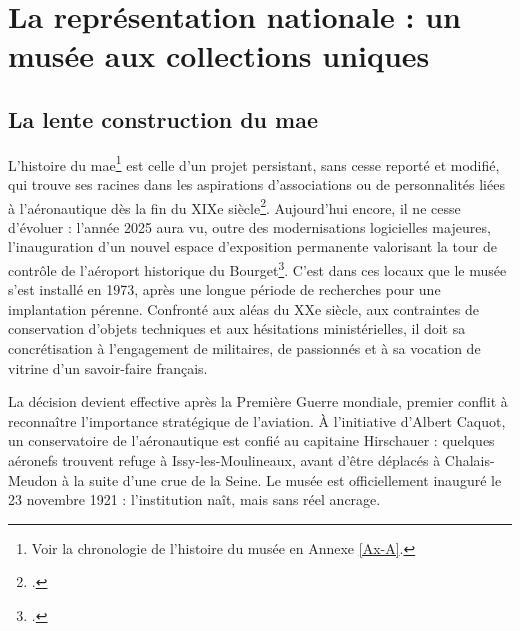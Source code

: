 %

\section{\label{I-A-1}La représentation nationale : un musée aux collections uniques}

\subsection{La lente construction du \ac{mae}}

L’histoire du \acf{mae}\footnote{Voir la chronologie de l'histoire du musée en Annexe \ref{Ax-A}.} est celle d’un projet persistant, sans cesse reporté et modifié, qui trouve ses racines dans les aspirations d'associations ou de personnalités liées à l'aéronautique dès la fin du XIXe siècle\footcite{terrierAeroportParisBourget2019}. Aujourd'hui encore, il ne cesse d'évoluer : l’année 2025 aura vu, outre des modernisations logicielles majeures, l'inauguration d’un nouvel espace d’exposition permanente valorisant la tour de contrôle de l’aéroport historique du Bourget\footcite{museedelairetdelespaceHallNavigationAerienne2025}. C’est dans ces locaux que le musée s’est installé en 1973, après une longue période de recherches pour une implantation pérenne. Confronté aux aléas du XXe siècle, aux contraintes de conservation d’objets techniques et aux hésitations ministérielles, il doit sa concrétisation à l’engagement de militaires, de passionnés et à sa vocation de vitrine d’un savoir-faire français.

La décision devient effective après la Première Guerre mondiale, premier conflit à reconnaître l’importance stratégique de l’aviation. À l’initiative d’Albert Caquot, un conservatoire de l’aéronautique est confié au capitaine Hirschauer : quelques aéronefs trouvent refuge à Issy-les-Moulineaux, avant d’être déplacés à Chalais-Meudon à la suite d’une crue de la Seine. Le musée est officiellement inauguré le 23 novembre 1921 : l’institution naît, mais sans réel ancrage.

